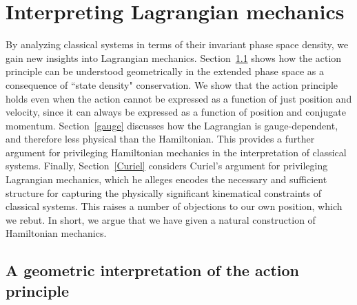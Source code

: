 \documentclass[letterpaper]{article}
\begin{document}




\section{Interpreting Lagrangian mechanics}
\label{Lagrangian}

By analyzing classical systems in terms of their invariant phase space density, we gain new insights into Lagrangian mechanics. Section~\ref{action} shows how the action principle can be understood geometrically in the extended phase space as a consequence of ``state density" conservation. We show that the action principle holds even when the action cannot be expressed as a function of just position and velocity, since it can always be expressed as a function of position and conjugate momentum. Section~\ref{gauge} discusses how the Lagrangian is gauge-dependent, and therefore less physical than the Hamiltonian. This provides a further argument for privileging Hamiltonian mechanics in the interpretation of classical systems. Finally, Section~\ref{Curiel} considers Curiel's \parencites*[]{Curiel} argument for privileging Lagrangian mechanics, which he alleges encodes the necessary and sufficient structure for capturing the physically significant kinematical constraints of classical systems. This raises a number of objections to our own position, which we rebut. In short, we  argue that we have given a natural construction of Hamiltonian mechanics.


\subsection{A geometric interpretation of the action principle}
\label{action}
\end{document}
